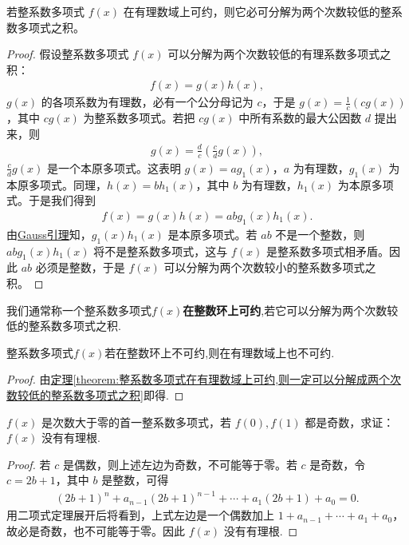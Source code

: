 \documentclass[../../main.tex]{subfiles}%
\begin{document}
\begin{theorem}\label{theorem:整系数多项式在有理数域上可约,则一定可以分解成两个次数较低的整系数多项式之积}
若整系数多项式 $f(x)$ 在有理数域上可约，则它必可分解为两个次数较低的整系数多项式之积。
\end{theorem}
\begin{proof}
假设整系数多项式 $f(x)$ 可以分解为两个次数较低的有理系数多项式之积：
\begin{align*}
f(x) = g(x)h(x),
\end{align*}
$g(x)$ 的各项系数为有理数，必有一个公分母记为 $c$，于是 $g(x) = \frac{1}{c}(cg(x))$，其中 $cg(x)$ 为整系数多项式。若把 $cg(x)$ 中所有系数的最大公因数 $d$ 提出来，则
\begin{align*}
g(x) = \frac{d}{c}\left(\frac{c}{d}g(x)\right),
\end{align*}
$\frac{c}{d}g(x)$ 是一个本原多项式。这表明 $g(x) = ag_1(x)$，$a$ 为有理数，$g_1(x)$ 为本原多项式。同理，$h(x) = bh_1(x)$，其中 $b$ 为有理数，$h_1(x)$ 为本原多项式。于是我们得到
\begin{align*}
f(x) = g(x)h(x) = abg_1(x)h_1(x).
\end{align*}
由\hyperref[lemma:Gauss引理]{Gauss引理}知，$g_1(x)h_1(x)$ 是本原多项式。若 $ab$ 不是一个整数，则 $abg_1(x)h_1(x)$ 将不是整系数多项式，这与 $f(x)$ 是整系数多项式相矛盾。因此 $ab$ 必须是整数，于是 $f(x)$ 可以分解为两个次数较小的整系数多项式之积。     
\end{proof}

\begin{definition}[整系数多项式在整数环上可约]
我们通常称一个整系数多项式$f(x)$\textbf{在整数环上可约},若它可以分解为两个次数较低的整系数多项式之积.
\end{definition}

\begin{proposition}\label{proposition:整数环上不可约一定在有理数域上不可约}
整系数多项式$f(x)$若在整数环上不可约,则在有理数域上也不可约.
\end{proposition}
\begin{proof}
由\hyperref[theorem:整系数多项式在有理数域上可约,则一定可以分解成两个次数较低的整系数多项式之积]{定理\ref{theorem:整系数多项式在有理数域上可约,则一定可以分解成两个次数较低的整系数多项式之积}}即得.
\end{proof}

\begin{example}
$f(x)$ 是次数大于零的首一整系数多项式，若 $f(0), f(1)$ 都是奇数，求证：$f(x)$ 没有有理根. 
\end{example}
\begin{proof}
若 $c$ 是偶数，则上述左边为奇数，不可能等于零。若 $c$ 是奇数，令 $c = 2b + 1$，其中 $b$ 是整数，可得
\begin{align*}
(2b + 1)^n + a_{n-1} (2b + 1)^{n-1} + \cdots + a_1 (2b + 1) + a_0 = 0.
\end{align*}
用二项式定理展开后将看到，上式左边是一个偶数加上 $1 + a_{n-1} + \cdots + a_1 + a_0$，故必是奇数，也不可能等于零。因此 $f(x)$ 没有有理根.
\end{proof}
\end{document}
